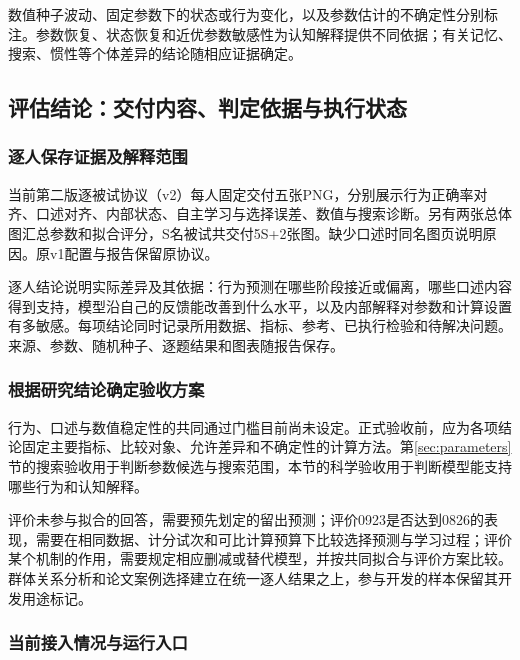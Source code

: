 \documentclass[12pt]{article}
\begin{document}
数值种子波动、固定参数下的状态或行为变化，以及参数估计的不确定性分别标注。参数恢复、状态恢复和近优参数敏感性为认知解释提供不同依据；有关记忆、搜索、惯性等个体差异的结论随相应证据确定。

\subsection{评估结论：交付内容、判定依据与执行状态}
\label{sec:evaluation-7}

\subsubsection{逐人保存证据及解释范围}

当前第二版逐被试协议（v2）每人固定交付五张PNG，分别展示行为正确率对齐、口述对齐、内部状态、自主学习与选择误差、数值与搜索诊断。另有两张总体图汇总参数和拟合评分，S名被试共交付5S+2张图。缺少口述时同名图页说明原因。原v1配置与报告保留原协议。

逐人结论说明实际差异及其依据：行为预测在哪些阶段接近或偏离，哪些口述内容得到支持，模型沿自己的反馈能改善到什么水平，以及内部解释对参数和计算设置有多敏感。每项结论同时记录所用数据、指标、参考、已执行检验和待解决问题。来源、参数、随机种子、逐题结果和图表随报告保存。

\subsubsection{根据研究结论确定验收方案}

行为、口述与数值稳定性的共同通过门槛目前尚未设定。正式验收前，应为各项结论固定主要指标、比较对象、允许差异和不确定性的计算方法。第\ref{sec:parameters}节的搜索验收用于判断参数候选与搜索范围，本节的科学验收用于判断模型能支持哪些行为和认知解释。

评价未参与拟合的回答，需要预先划定的留出预测；评价0923是否达到0826的表现，需要在相同数据、计分试次和可比计算预算下比较选择预测与学习过程；评价某个机制的作用，需要规定相应删减或替代模型，并按共同拟合与评价方案比较。群体关系分析和论文案例选择建立在统一逐人结果之上，参与开发的样本保留其开发用途标记。

\subsubsection{当前接入情况与运行入口}
\end{document}
